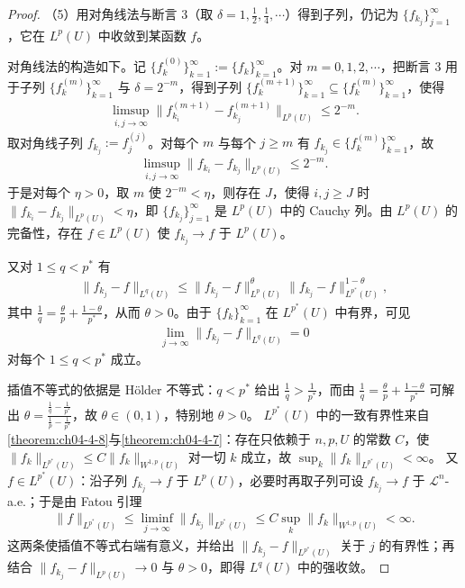 ﻿\documentclass[../../main.tex]{subfiles}%
\begin{document}
\begin{proof}
（5）用对角线法与断言 3（取 $\delta=1,\frac12,\frac14,\cdots$）得到子列，仍记为 $\{f_{k_j}\}_{j=1}^{\infty}$，它在 $L^p(U)$ 中收敛到某函数 $f$。

对角线法的构造如下。记 $\{f^{(0)}_k\}_{k=1}^{\infty}:=\{f_k\}_{k=1}^{\infty}$。对 $m=0,1,2,\cdots$，把断言 3 用于子列 $\{f^{(m)}_k\}_{k=1}^{\infty}$ 与 $\delta=2^{-m}$，得到子列 $\{f^{(m+1)}_k\}_{k=1}^{\infty}\subseteq\{f^{(m)}_k\}_{k=1}^{\infty}$，使得
\begin{align*}
\limsup_{i,j\to\infty}\lVert f^{(m+1)}_{k_i}-f^{(m+1)}_{k_j}\rVert_{L^p(U)}\leqslant2^{-m}.
\end{align*}
取对角线子列 $f_{k_j}:=f^{(j)}_j$。对每个 $m$ 与每个 $j\geqslant m$ 有 $f_{k_j}\in\{f^{(m)}_k\}_{k=1}^{\infty}$，故
\begin{align*}
\limsup_{i,j\to\infty}\lVert f_{k_i}-f_{k_j}\rVert_{L^p(U)}\leqslant2^{-m}.
\end{align*}
于是对每个 $\eta>0$，取 $m$ 使 $2^{-m}<\eta$，则存在 $J$，使得 $i,j\geqslant J$ 时 $\lVert f_{k_i}-f_{k_j}\rVert_{L^p(U)}<\eta$，即 $\{f_{k_j}\}_{j=1}^{\infty}$ 是 $L^p(U)$ 中的 Cauchy 列。由 $L^p(U)$ 的完备性，存在 $f\in L^p(U)$ 使 $f_{k_j}\to f$ 于 $L^p(U)$。

又对 $1\leqslant q<p^*$ 有
\begin{align*}
\lVert f_{k_j}-f\rVert_{L^q(U)}\leqslant\lVert f_{k_j}-f\rVert^{\theta}_{L^p(U)}\lVert f_{k_j}-f\rVert^{1-\theta}_{L^{p^*}(U)},
\end{align*}
其中 $\frac1q=\frac{\theta}{p}+\frac{1-\theta}{p^*}$，从而 $\theta>0$。由于 $\{f_k\}_{k=1}^{\infty}$ 在 $L^{p^*}(U)$ 中有界，可见
\begin{align*}
\lim_{j\to\infty}\lVert f_{k_j}-f\rVert_{L^q(U)}=0
\end{align*}
对每个 $1\leqslant q<p^*$ 成立。

插值不等式的依据是 Hölder 不等式：$q<p^*$ 给出 $\frac1q>\frac1{p^*}$，而由 $\frac1q=\frac{\theta}{p}+\frac{1-\theta}{p^*}$ 可解出 $\theta=\frac{\frac1q-\frac1{p^*}}{\frac1p-\frac1{p^*}}$，故 $\theta\in(0,1)$，特别地 $\theta>0$。%
$L^{p^*}(U)$ 中的一致有界性来自\cref{theorem:ch04-4-8}与\cref{theorem:ch04-4-7}：存在只依赖于 $n,p,U$ 的常数 $C$，使 $\lVert f_k\rVert_{L^{p^*}(U)}\leqslant C\lVert f_k\rVert_{W^{1,p}(U)}$ 对一切 $k$ 成立，故 $\sup_k\lVert f_k\rVert_{L^{p^*}(U)}<\infty$。%
又 $f\in L^{p^*}(U)$：沿子列 $f_{k_j}\to f$ 于 $L^p(U)$，必要时再取子列可设 $f_{k_j}\to f$ 于 $\mathcal{L}^n$-a.e.；于是由 Fatou 引理
\begin{align*}
\lVert f\rVert_{L^{p^*}(U)}\leqslant\liminf_{j\to\infty}\lVert f_{k_j}\rVert_{L^{p^*}(U)}\leqslant C\sup_{k}\lVert f_k\rVert_{W^{1,p}(U)}<\infty .
\end{align*}
这两条使插值不等式右端有意义，并给出 $\lVert f_{k_j}-f\rVert_{L^{p^*}(U)}$ 关于 $j$ 的有界性；再结合 $\lVert f_{k_j}-f\rVert_{L^p(U)}\to0$ 与 $\theta>0$，即得 $L^q(U)$ 中的强收敛。


\end{proof}
\end{document}
